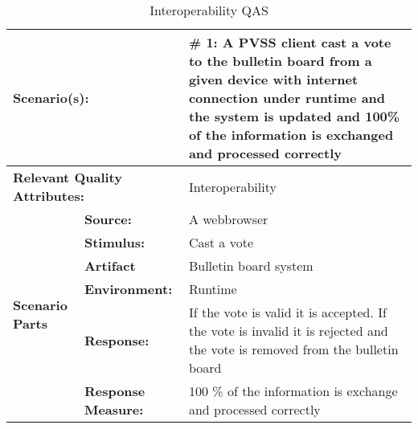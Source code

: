 \begin{table}[H]
\begin{center}
\begin{tabular}{|p{0.3cm}|p{2.5cm}|p{8cm}|}
  \hline
  \multicolumn{2}{|p{3cm}|}{\bfseries Scenario(s):} & \#  1: A PVSS client cast a vote to the bulletin board from a given device with internet connection  under runtime and the system is updated and 100\% of the information is exchanged  and processed correctly\\
  \hline
  \multicolumn{2}{|p{3cm}|}{\bfseries Relevant Quality Attributes:} & Interoperability\\
  \hline
  \multirow{6}{*}{\begin{sideways}{\bfseries Scenario Parts}\end{sideways}}
  & {\bfseries Source:} & A webbrowser \\
  \cline{2-3}
  & {\bfseries Stimulus:} & Cast a vote \\
  \cline{2-3}
  & {\bfseries Artifact} &  Bulletin board system \\
  \cline{2-3}
  & {\bfseries Environment:} &  Runtime \\
  \cline{2-3}
  & {\bfseries Response:} &  If the vote is valid it is accepted. If the vote is invalid it is rejected and the vote is removed from the bulletin board \\
  \cline{2-3}
  & {\bfseries Response Measure:} & 100 \% of the information is exchange and processed correctly \\
  \hline
\end{tabular}
\caption{Interoperability QAS}
\end{center}
\end{table}


